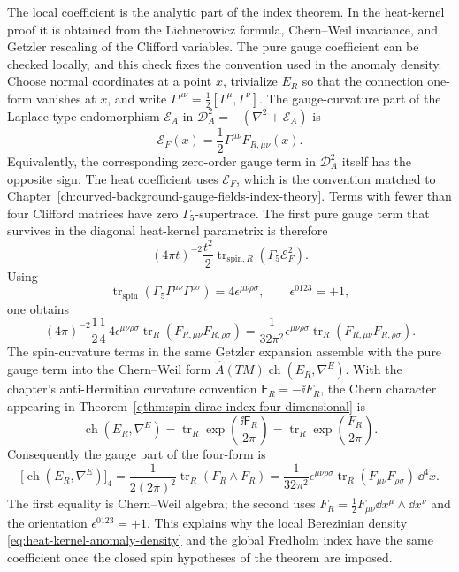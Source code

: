 The local coefficient is the analytic part of the index theorem.  In the
heat-kernel proof it is obtained from the Lichnerowicz formula, Chern--Weil
invariance, and Getzler rescaling of the Clifford variables.  The pure gauge
coefficient can be checked locally, and this check fixes the convention used
in the anomaly density.  Choose normal coordinates at a point \(x\), trivialize
\(E_R\) so that the connection one-form vanishes at \(x\), and write
\(\Gamma^{\mu\nu}=\frac12[\Gamma^\mu,\Gamma^\nu]\).  The gauge-curvature
part of the Laplace-type endomorphism
\(\mathcal E_A\) in
\(\mathcal D_A^2=-(\nabla^2+\mathcal E_A)\) is
\[
  \mathcal E_F(x)
  =
  \frac12\Gamma^{\mu\nu}F_{R,\mu\nu}(x).
\]
Equivalently, the corresponding zero-order gauge term in
\(\mathcal D_A^2\) itself has the opposite sign.  The heat coefficient uses
\(\mathcal E_F\), which is the convention matched to
Chapter~\ref{ch:curved-background-gauge-fields-index-theory}.
Terms with fewer than four Clifford matrices have zero
\(\Gamma_5\)-supertrace.  The first pure gauge term that survives in the
diagonal heat-kernel parametrix is therefore
\[
  (4\pi t)^{-2}
  \frac{t^2}{2}
  \operatorname{tr}_{\mathrm{spin},R}
  \left(\Gamma_5\mathcal E_F^2\right).
\]
Using
\[
  \operatorname{tr}_{\mathrm{spin}}
  \left(\Gamma_5\Gamma^{\mu\nu}\Gamma^{\rho\sigma}\right)
  =
  4\epsilon^{\mu\nu\rho\sigma},
  \qquad \epsilon^{0123}=+1,
\]
one obtains
\[
  (4\pi)^{-2}\frac12\frac14\,
  4\epsilon^{\mu\nu\rho\sigma}
  \operatorname{tr}_R(F_{R,\mu\nu}F_{R,\rho\sigma})
  =
  \frac{1}{32\pi^2}
  \epsilon^{\mu\nu\rho\sigma}
  \operatorname{tr}_R(F_{R,\mu\nu}F_{R,\rho\sigma}).
\]
The spin-curvature terms in the same Getzler expansion assemble with the
pure gauge term into the Chern--Weil form
\(\widehat A(TM)\operatorname{ch}(E_R,\nabla^E)\).  With the chapter's
anti-Hermitian curvature convention
\(\mathsf F_R=-\ii F_R\), the Chern character appearing in
Theorem~\ref{qthm:spin-dirac-index-four-dimensional} is
\[
  \operatorname{ch}(E_R,\nabla^E)
  =
  \operatorname{tr}_R
  \exp\!\left(\frac{\ii\mathsf F_R}{2\pi}\right)
  =
  \operatorname{tr}_R
  \exp\!\left(\frac{F_R}{2\pi}\right).
\]
Consequently the gauge part of the four-form is
\begin{equation}
  \bigl[\operatorname{ch}(E_R,\nabla^E)\bigr]_4
  =
  \frac1{2(2\pi)^2}\operatorname{tr}_R(F_R\wedge F_R)
  =
  \frac1{32\pi^2}
  \epsilon^{\mu\nu\rho\sigma}
  \operatorname{tr}_R(F_{\mu\nu}F_{\rho\sigma})\,\dd^4x .
  \label{eq:dirac-index-four-form-normalization}
\end{equation}
The first equality is Chern--Weil algebra; the second uses
\(F_R=\frac12F_{\mu\nu}\dd x^\mu\wedge\dd x^\nu\) and the orientation
\(\epsilon^{0123}=+1\).  This explains why the local Berezinian density
\eqref{eq:heat-kernel-anomaly-density} and the global Fredholm index have the
same coefficient once the closed spin hypotheses of the theorem are imposed.

